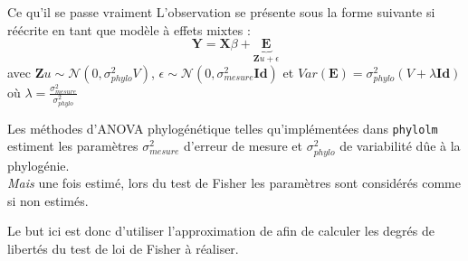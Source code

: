 \documentclass[10pt]{beamer}\usepackage[]{graphicx}\usepackage[]{xcolor}
\begin{document}
\begin{frame}[fragile]{Ce qu'il se passe vraiment}
L'observation se présente sous la forme suivante si réécrite en tant que modèle à effets mixtes :
$$\bm{Y} = \bm{X}\beta + \underbrace{\bm{E}}_{\bm{Z} u + \epsilon} $$
avec $\bm{Z} u \sim \mathcal{N}(0,\sigma^2_{phylo}V)$, $\epsilon \sim \mathcal{N}(0,\sigma^2_{mesure}\bm{Id})$ et $Var(\bm{E})=\sigma^2_{phylo} (V + \lambda\bm{Id})$ où $\lambda=\frac{\sigma^2_{mesure}}{\sigma^2_{phylo}}$

Les méthodes d'ANOVA phylogénétique telles qu'implémentées dans \texttt{phylolm} estiment les paramètres $\sigma^2_{mesure}$ d'erreur de mesure et $\sigma^2_{phylo}$ de variabilité dûe à la phylogénie.\\
\emph{Mais} une fois estimé, lors du test de Fisher les paramètres sont considérés comme si non estimés.


Le but ici est donc d'utiliser l'approximation de \textcite{satterthwaiteApproximateDistributionEstimates1946} afin de calculer les degrés de libertés du test de loi de Fisher à réaliser.
\end{frame}
\end{document}
